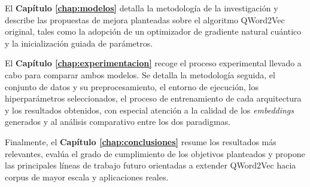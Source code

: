 El \textbf{Capítulo \ref{chap:modelos}} detalla la metodología de la investigación y describe las propuestas de mejora planteadas sobre el algoritmo QWord2Vec original, tales como la adopción de un optimizador de gradiente natural cuántico y la inicialización guiada de parámetros.

El \textbf{Capítulo \ref{chap:experimentacion}} recoge el proceso experimental llevado a cabo para comparar ambos modelos. Se detalla la metodología seguida, el conjunto de datos y su preprocesamiento, el entorno de ejecución, los hiperparámetros seleccionados, el proceso de entrenamiento de cada arquitectura y los resultados obtenidos, con especial atención a la calidad de los \textit{embeddings} generados y al análisis comparativo entre los dos paradigmas.

Finalmente, el \textbf{Capítulo \ref{chap:conclusiones}} resume los resultados más relevantes, evalúa el grado de cumplimiento de los objetivos planteados y propone las principales líneas de trabajo futuro orientadas a extender QWord2Vec hacia corpus de mayor escala y aplicaciones reales.
